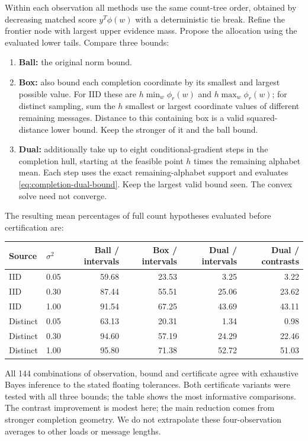\documentclass[10pt,a4paper]{article}
\begin{document}
Within each observation all methods use the same count-tree order, obtained by decreasing matched score
$y^T\phi(w)$ with a deterministic tie break. Refine the frontier node with largest upper evidence mass.
Propose the allocation using the evaluated lower tails. Compare three bounds:
\begin{enumerate}
\item \textbf{Ball:} the original norm bound.
\item \textbf{Box:} also bound each completion coordinate by its smallest and largest possible value.
      For IID these are $h\min_w\phi_r(w)$ and $h\max_w\phi_r(w)$; for distinct sampling, sum the $h$ smallest
      or largest coordinate values of different remaining messages. Distance to this containing box is a
      valid squared-distance lower bound. Keep the stronger of it and the ball bound.
\item \textbf{Dual:} additionally take up to eight conditional-gradient steps in the completion hull, starting
      at the feasible point $h$ times the remaining alphabet mean. Each step uses the exact remaining-alphabet
      support and evaluates \eqref{eq:completion-dual-bound}. Keep the largest valid bound seen.
      The convex solve need not converge.
\end{enumerate}
The resulting mean percentages of full count hypotheses evaluated before certification are:
\begin{center}
\begin{tabular}{@{}llrrrr@{}}\toprule
Source & $\sigma^2$ & Ball / intervals & Box / intervals & Dual / intervals & Dual / contrasts\\\midrule
IID & 0.05 & 59.68 & 23.53 & 3.25 & 3.22\\
IID & 0.30 & 87.44 & 55.51 & 25.06 & 23.62\\
IID & 1.00 & 91.54 & 67.25 & 43.69 & 43.11\\
Distinct & 0.05 & 63.13 & 20.31 & 1.34 & 0.98\\
Distinct & 0.30 & 94.60 & 57.19 & 24.29 & 22.46\\
Distinct & 1.00 & 95.80 & 71.38 & 52.72 & 51.03\\\bottomrule
\end{tabular}
\end{center}
All 144 combinations of observation, bound and certificate agree with exhaustive Bayes inference to the stated
floating tolerances. Both certificate variants were tested with all three bounds; the table shows the most
informative comparisons. The contrast improvement is modest here; the main reduction comes from stronger
completion geometry. We do not extrapolate these four-observation averages to other loads or message lengths.
\end{document}
